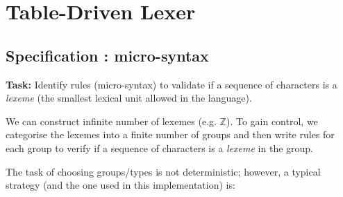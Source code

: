 \flushleft
\chapter{Table-Driven Lexer}
\section{Specification : micro-syntax}

\textbf{Task:} Identify rules (micro-syntax) to validate if a sequence of characters is a \emph{lexeme} (the smallest lexical unit allowed in the language).

\vskip 0.2in

We can construct infinite number of lexemes (e.g.  $\mathbb{Z}$). To gain control, we categorise the lexemes into a finite number of groups and then write rules for each group to verify if a sequence of characters is a \emph{lexeme} in the group.

\vskip 0.2in

The task of choosing groups/types is not deterministic; however, a typical strategy (and the one used in this implementation) is:

